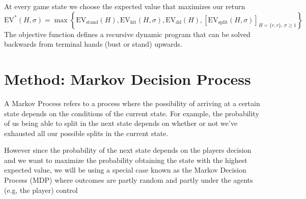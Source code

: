 \documentclass[12pt,a4paper]{cibb}
\begin{document}
At every game state we choose the expected value that maximizes our return
\begin{equation}
\mathrm{EV}^*(H, σ  ) =
\max \left\{
\mathrm{EV}_{\text{stand}}(H),
\mathrm{EV}_{\text{hit}}(H, σ  ),
\mathrm{EV}_{\text{dd}}(H),
\left[\mathrm{EV}_{\text{split}}(H, σ  )\right]_{H = \{r, r\},\, σ   \geq 1}
\right\}
\label{eq:OBJ_FUNCTION}
    \end{equation}
The objective function defines a recursive dynamic program that can be solved backwards from terminal hands (bust or stand) upwards. 

\section*{Method: Markov Decision Process }
A Markov Process refers to a process where the possibility of arriving at a certain state depends on the conditions of the current state. For example, the probability of us being able to split in the next state depends on whether or not we've exhausted all our possible splits in the current state.

However since the probability of the next state depends on the players decision and we want to maximize the probability obtaining the state with the highest expected value, we will be using a special case known as the Markov Decision Process (MDP) where outcomes are partly random and partly under the agents (e.g, the player) control
\end{document}
